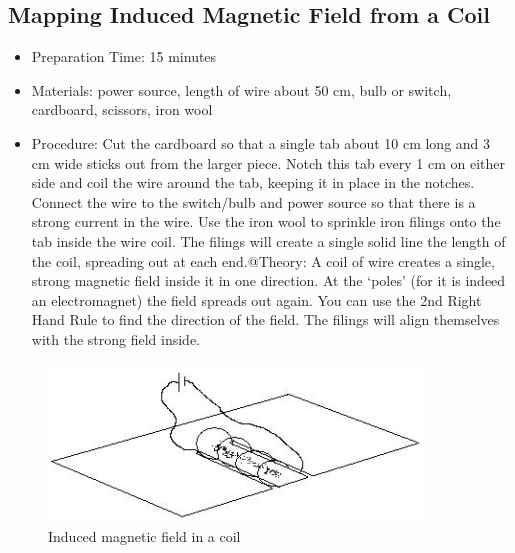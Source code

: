 \subsection{Mapping Induced Magnetic Field from a Coil}
\begin{itemize}
\item{Preparation Time: 15 minutes}
\item{Materials: power source, length of wire about 50 cm, bulb or switch, cardboard, scissors, iron wool}
\item{Procedure: Cut the cardboard so that a single tab about 10 cm long and 3 cm wide sticks out from the larger piece. Notch this tab every 1 cm on either side and coil the wire around the tab, keeping it in place in the notches. Connect the wire to the switch/bulb and power source so that there is a strong current in the wire. Use the iron wool to sprinkle iron filings onto the tab inside the wire coil. The filings will create a single solid line the length of the coil, spreading out at each end.@Theory: A coil of wire creates a single, strong magnetic field inside it in one direction. At the ‘poles’ (for it is indeed an electromagnet) the field spreads out again. You can use the 2nd Right Hand Rule to find the direction of the field. The filings will align themselves with the strong field inside.}
\end{itemize}

\begin{figure}[h!]
\begin{center}
\includegraphics[width=10cm]{./img/induced-mag-field-coil.png}
\caption{Induced magnetic field in a coil}
\label{fig:induced-mag-field-coil}
\end{center}
\end{figure}

